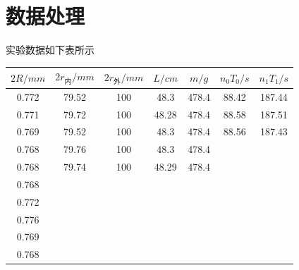 \documentclass[UTF8]{ctexart}
\begin{document}
\section{数据处理}
实验数据如下表所示
\begin{table}[H]\centering
    \begin{tabular}{ccccccc}
        \hline\hline
        $2R/mm$&$2r_\text{内}/mm$&$2r_\text{外}/mm$&$L/cm$&$m/g$&$n_0T_0/s$&$n_1T_1/s$\\
        \hline
        0.772&79.52&100&48.3&478.4&88.42&187.44\\
        0.771&79.72&100&48.28&478.4&88.58&187.51\\
        0.769&79.52&100&48.3&478.4&88.56&187.43\\
        0.768&79.76&100&48.3&478.4\\
        0.768&79.74&100&48.29&478.4\\
        0.768\\
        0.772\\
        0.776\\
        0.769\\
        0.768\\
        \hline\hline
    \end{tabular}
\end{table}
\end{document}

